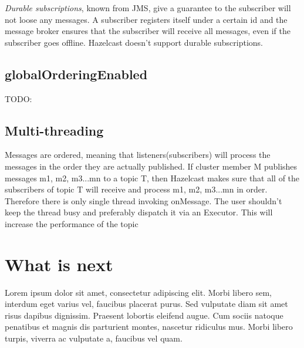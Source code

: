 \emph{Durable subscriptions}, known from JMS, give a guarantee to the subscriber will not loose any messages. A subscriber registers itself under a certain id and the message broker ensures that the subscriber will receive all messages, even if the subscriber goes offline. Hazelcast doesn't support durable subscriptions.

\subsection{globalOrderingEnabled}
TODO:

\subsection{Multi-threading}
Messages are ordered, meaning that listeners(subscribers) will process the messages in the order they are actually published. If cluster member M publishes messages m1, m2, m3...mn to a topic T, then Hazelcast makes sure that all of the subscribers of topic T will receive and process m1, m2, m3...mn in order. Therefore there is only single thread invoking onMessage. The user shouldn't keep the thread busy and preferably dispatch it via an Executor. This will increase the performance of the topic

\section{What is next}
Lorem ipsum dolor sit amet, consectetur adipiscing elit. Morbi libero sem,
interdum eget varius vel, faucibus placerat purus. Sed vulputate diam sit amet
risus dapibus dignissim. Praesent lobortis eleifend augue. Cum sociis natoque
penatibus et magnis dis parturient montes, nascetur ridiculus mus. Morbi libero
turpis, viverra ac vulputate a, faucibus vel quam.
